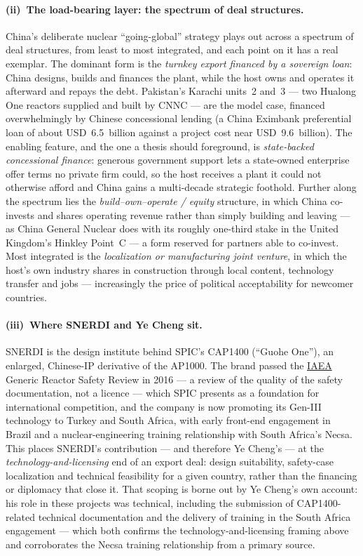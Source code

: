 \documentclass[11pt]{article}
\newcommand{\jl}[2]{\href{#2}{#1}}
\begin{document}
\paragraph{(ii)~The load-bearing layer: the spectrum of deal structures.}
China's deliberate nuclear ``going-global'' strategy\cite{kenderdine2016} plays out across a spectrum of deal structures, from least to most integrated, and each point on it has a real exemplar. The dominant form is the \emph{turnkey export financed by a sovereign loan}: China designs, builds and finances the plant, while the host owns and operates it afterward and repays the debt. Pakistan's Karachi units~2 and~3 --- two Hualong One reactors supplied and built by CNNC --- are the model case, financed overwhelmingly by Chinese concessional lending (a China Eximbank preferential loan of about USD~6.5~billion against a project cost near USD~9.6~billion).\cite{wnn_karachi,aiddata_kanupp} The enabling feature, and the one a thesis should foreground, is \emph{state-backed concessional finance}: generous government support lets a state-owned enterprise offer terms no private firm could, so the host receives a plant it could not otherwise afford and China gains a multi-decade strategic foothold. Further along the spectrum lies the \emph{build--own--operate / equity} structure, in which China co-invests and shares operating revenue rather than simply building and leaving --- as China General Nuclear does with its roughly one-third stake in the United Kingdom's Hinkley Point~C --- a form reserved for partners able to co-invest.\cite{wnn_china} Most integrated is the \emph{localization or manufacturing joint venture}, in which the host's own industry shares in construction through local content, technology transfer and jobs --- increasingly the price of political acceptability for newcomer countries.

\paragraph{(iii)~Where SNERDI and Ye Cheng sit.}
SNERDI is the design institute behind SPIC's CAP1400 (``Guohe One''), an enlarged, Chinese-IP derivative of the AP1000.\cite{wnn_china} The brand passed the \jl{IAEA}{https://www.iaea.org/} Generic Reactor Safety Review in 2016 --- a review of the quality of the safety documentation, not a licence --- which SPIC presents as a foundation for international competition, and the company is now promoting its Gen-III technology to Turkey and South Africa, with early front-end engagement in Brazil and a nuclear-engineering training relationship with South Africa's Necsa.\cite{powermag_cap1400,wnn_china,snerdi_intl} This places SNERDI's contribution --- and therefore Ye Cheng's --- at the \emph{technology-and-licensing} end of an export deal: design suitability, safety-case localization and technical feasibility for a given country, rather than the financing or diplomacy that close it. That scoping is borne out by Ye Cheng's own account: his role in these projects was technical, including the submission of CAP1400-related technical documentation and the delivery of training in the South Africa engagement --- which both confirms the technology-and-licensing framing above and corroborates the Necsa training relationship from a primary source.
\end{document}

